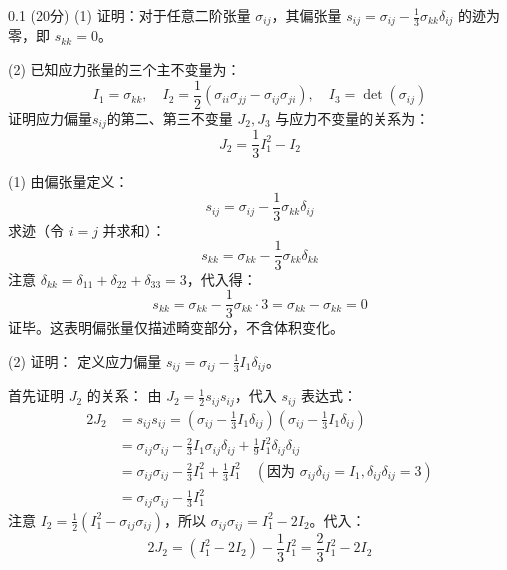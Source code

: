     \begin{question}{0.1}
        (20分) (1) 证明：对于任意二阶张量 \( \sigma_{ij} \)，其偏张量 \( s_{ij} = \sigma_{ij} - \frac{1}{3}\sigma_{kk}\delta_{ij} \) 的迹为零，即 \( s_{kk} = 0 \)。

        (2) 已知应力张量的三个主不变量为：
        \[
        I_1 = \sigma_{kk}, \quad I_2 = \frac{1}{2}(\sigma_{ii}\sigma_{jj} - \sigma_{ij}\sigma_{ji}), \quad I_3 = \det(\sigma_{ij})
        \]
        证明应力偏量$s_{ij}$的第二、第三不变量 \( J_2, J_3 \) 与应力不变量的关系为：
        \[
        J_2 = \frac{1}{3}I_1^2 - I_2
        \]

    \end{question}
    
    \begin{solution}
        (1) 由偏张量定义：
        \[
        s_{ij} = \sigma_{ij} - \frac{1}{3}\sigma_{kk}\delta_{ij}
        \]
        求迹（令 \( i = j \) 并求和）：
        \[
        s_{kk} = \sigma_{kk} - \frac{1}{3}\sigma_{kk}\delta_{kk}
        \]
        注意 \( \delta_{kk} = \delta_{11} + \delta_{22} + \delta_{33} = 3 \)，代入得：
        \[
        s_{kk} = \sigma_{kk} - \frac{1}{3}\sigma_{kk} \cdot 3 = \sigma_{kk} - \sigma_{kk} = 0
        \]
        证毕。这表明偏张量仅描述畸变部分，不含体积变化。

        (2) 证明：
定义应力偏量 \( s_{ij} = \sigma_{ij} - \frac{1}{3}I_1\delta_{ij} \)。

首先证明 \( J_2 \) 的关系：
由 \( J_2 = \frac{1}{2}s_{ij}s_{ij} \)，代入 \( s_{ij} \) 表达式：
\[
\begin{aligned}
2J_2 &= s_{ij}s_{ij} = \left(\sigma_{ij} - \frac{1}{3}I_1\delta_{ij}\right)\left(\sigma_{ij} - \frac{1}{3}I_1\delta_{ij}\right) \\
&= \sigma_{ij}\sigma_{ij} - \frac{2}{3}I_1\sigma_{ij}\delta_{ij} + \frac{1}{9}I_1^2\delta_{ij}\delta_{ij} \\
&= \sigma_{ij}\sigma_{ij} - \frac{2}{3}I_1^2 + \frac{1}{3}I_1^2 \quad (\text{因为 } \sigma_{ij}\delta_{ij}=I_1, \delta_{ij}\delta_{ij}=3) \\
&= \sigma_{ij}\sigma_{ij} - \frac{1}{3}I_1^2
\end{aligned}
\]
注意 \( I_2 = \frac{1}{2}(I_1^2 - \sigma_{ij}\sigma_{ij}) \)，所以 \( \sigma_{ij}\sigma_{ij} = I_1^2 - 2I_2 \)。代入：
\[
2J_2 = (I_1^2 - 2I_2) - \frac{1}{3}I_1^2 = \frac{2}{3}I_1^2 - 2I_2
\]
    \end{solution}
